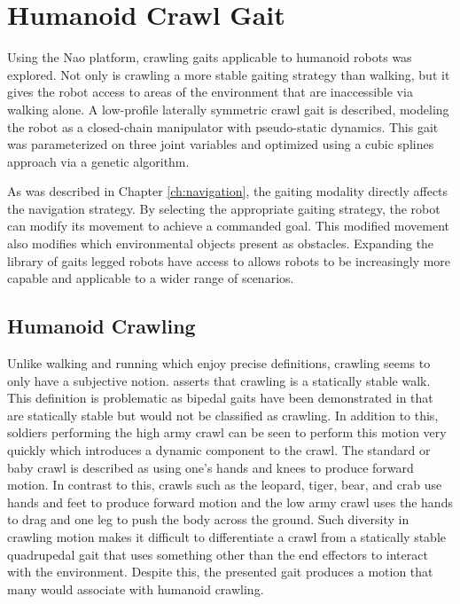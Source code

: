 
\chapter{Humanoid Crawl Gait} \label{ch:crawl_gait}

Using the Nao platform, crawling gaits applicable to humanoid robots was explored. 
Not only is crawling a more stable gaiting strategy than walking, but it gives the robot access to areas
of the environment that are inaccessible via walking alone. A low-profile laterally symmetric crawl gait is described, 
modeling the robot as a closed-chain manipulator with pseudo-static dynamics. This gait was parameterized on 
three joint variables and optimized using a cubic splines approach via a genetic algorithm.

As was described in Chapter \ref{ch:navigation}, the gaiting modality directly affects the navigation strategy.
By selecting the appropriate gaiting strategy, the robot can modify its movement to achieve a commanded goal.
This modified movement also modifies which environmental objects present as obstacles.
Expanding the library of gaits legged robots have access to allows robots to be increasingly more capable
and applicable to a wider range of scenarios.

\section{Humanoid Crawling}

Unlike walking and running which enjoy precise definitions, crawling seems to only have a subjective notion.
\cite{Dudek2000} asserts that crawling is a statically stable walk. This definition is problematic
as bipedal gaits have been demonstrated in \cite{figureoutacitation} that are statically stable but would not
be classified as crawling. In addition to this, soldiers performing the high army crawl \cite{armyfieldmanual2008} can be seen to
perform this motion very quickly which introduces a dynamic component to the crawl.
The standard or baby crawl is described as using one's hands and knees to produce forward motion.
In contrast to this, crawls such as the leopard, tiger, bear, and crab use hands and feet to produce
forward motion and the low army crawl uses the hands to drag and one leg to push the body across the ground.
Such diversity in crawling motion makes it difficult to differentiate a crawl from a statically stable
quadrupedal gait that uses something other than the end effectors to interact with the environment.
Despite this, the presented gait produces a motion that many would associate with humanoid crawling.

